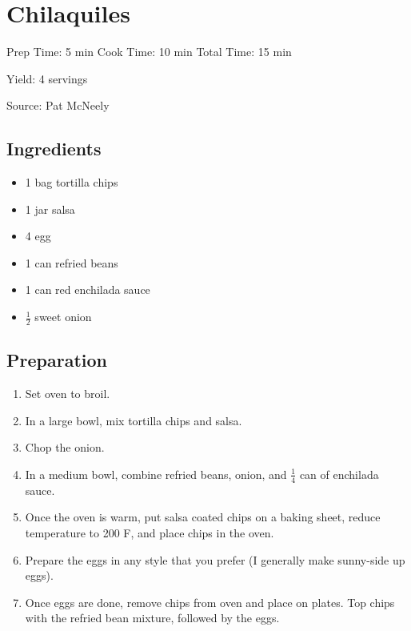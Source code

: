 \section{Chilaquiles}

\begin{center}
Prep Time: 5 min
Cook Time: 10 min
Total Time: 15 min

\noindent Yield: 4 servings

\vspace{1em}

  Source: Pat McNeely
\end{center}

\subsection{Ingredients}
\begin{multicols}{2}
\begin{itemize}
  \item 1 bag tortilla chips
  \item 1 jar salsa
  \item 4 egg
  \item 1 can refried beans
  \item 1 can red enchilada sauce
  \item $\frac{1}{2}$ sweet onion
\end{itemize}
\end{multicols}

\subsection{Preparation}
\begin{enumerate}
  \item Set oven to broil.
  \item In a large bowl, mix tortilla chips and salsa.
  \item Chop the onion.
  \item In a medium bowl, combine refried beans, onion, and $\frac{1}{4}$ can of enchilada sauce.
  \item Once the oven is warm, put salsa coated chips on a baking sheet, reduce temperature to 200 F, and place chips in the oven.
  \item Prepare the eggs in any style that you prefer (I generally make sunny-side up eggs).
  \item Once eggs are done, remove chips from oven and place on plates. Top chips with the refried bean mixture, followed by the eggs.
\end{enumerate}
